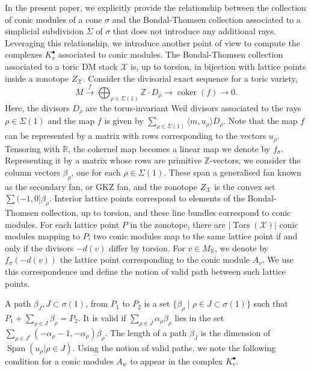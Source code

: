 \documentclass[reqno, 12pt]{amsart}
\theoremstyle{definition}
\numberwithin{equation}{section}
\newcommand{\newterm}{\textsf}
\newcommand{\Z}{\mathbb{Z}}
\newcommand{\R}{\mathbb{R}}
\begin{document}
In the present paper, we explicitly provide the relationship between the collection of conic modules of a cone $\sigma$ and the Bondal-Thomsen collection associated to a simplicial subdivision $\Sigma$ of $\sigma$ that does not introduce any additional rays. Leveraging this relationship, we introduce another point of view to compute the complexes $K_v^\bullet$ associated to conic modules. The Bondal-Thomsen collection associated to a toric DM stack $\mathcal{X}$ is, up to torsion, in bijection with lattice points inside a zonotope $Z_\mathcal{X}$. Consider the divisorial exact sequence for a toric variety, \[
M\xrightarrow{f} \bigoplus_{\rho\in \Sigma(1)}\Z\cdot D_\rho\rightarrow \operatorname{coker}(f)\rightarrow 0.
\]
Here, the divisors $D_\rho$ are the torus-invariant Weil divisors associated to the rays $\rho\in \Sigma(1)$ and the map $f$ is given by $\sum_{\rho\in \Sigma(1)}\langle m,u_\rho\rangle D_\rho$. Note that the map $f$ can be represented by a matrix with rows corresponding to the vectors $u_\rho$. Tensoring with $\R$, the cokernel map becomes a linear map we denote by $f_{\sigma}$. Representing it by a matrix whose rows are primitive $\Z$-vectors, we consider the column vectors $\beta_\rho$, one for each $\rho\in \Sigma(1)$. These span a generalised fan known as the secondary fan, or GKZ fan, and the zonotope $Z_{\mathcal{X}}$ is the convex set $\sum (-1,0]\beta_\rho$. Interior lattice points correspond to elements of the Bondal-Thomsen collection, up to torsion, and these line bundles correspond to conic modules. For each lattice point $P$ in the zonotope, there are $|\operatorname{Tors}(\mathcal{X})|$ conic modules mapping to $P$; two conic modules map to the same lattice point if and only if the divisors $-d(v)$  differ by torsion.
For $v\in M_\R$, we denote by $f_\sigma(-d(v))$ the lattice point corresponding to the conic module $A_v$. We use this correspondence and define the notion of \newterm{valid path} between such lattice points. 

\noindent A path $\beta_J, J\subset \sigma(1)$, from $P_1$ to $P_2$ is a set $\{\beta_\rho\mid \rho\in J\subset\sigma(1)\}$ such that $P_1+\sum_{\rho\in J}\beta_\rho=P_2$. It is \newterm{valid} if $\sum_{\rho\in J}\alpha_\rho\beta_\rho$ lies in the set $\sum_{\rho\in J^c}(-\alpha_\rho-1,-\alpha_\rho)\beta_\rho$. The length of a path $\beta_J$ is the dimension of $\operatorname{Span}(u_\rho\vert\rho\in J)$. Using the notion of valid paths, we note the following condition for a conic modules $A_w$ to appear in the complex $K_v^\bullet$.
\end{document}
